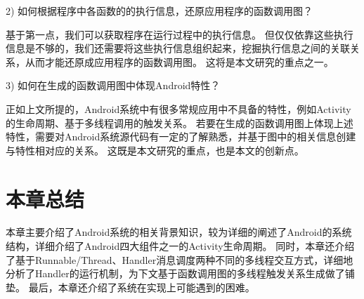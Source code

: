 2)	如何根据程序中各函数的的执行信息，还原应用程序的函数调用图？

基于第一点，我们可以获取程序在运行过程中的执行信息。
但仅仅依靠这些执行信息是不够的，我们还需要将这些执行信息组织起来，挖掘执行信息之间的关联关系，从而才能还原成应用程序的函数调用图。
这将是本文研究的重点之一。

3)	如何在生成的函数调用图中体现Android特性？

正如上文所提的，Android系统中有很多常规应用中不具备的特性，例如Activity的生命周期、基于多线程调用的触发关系。
若要在生成的函数调用图上体现上述特性，需要对Android系统源代码有一定的了解熟悉，并基于图中的相关信息创建与特性相对应的关系。
这既是本文研究的重点，也是本文的创新点。

\section{本章总结}

本章主要介绍了Android系统的相关背景知识，较为详细的阐述了Android的系统结构，详细介绍了Android四大组件之一的Activity生命周期。
同时，本章还介绍了基于Runnable/Thread、Handler消息调度两种不同的多线程交互方式，详细地分析了Handler的运行机制，为下文基于函数调用图的多线程触发关系生成做了铺垫。
最后，本章还介绍了系统在实现上可能遇到的困难。
